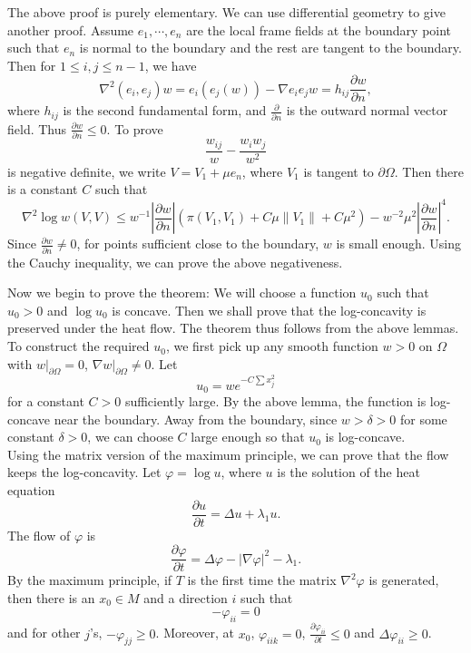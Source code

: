 \begin{remark}
The above proof is purely elementary. We can use differential geometry to give
another proof. Assume $e_1, \cdots, e_n$ are the local frame fields at the
boundary point such that $e_n$ is normal to the boundary and the rest are
tangent to the boundary. Then for $1\leqslant i, j \leqslant n-1$, we have
\[
\nabla^2 (e_i,e_j) w = e_i(e_j(w)) - \nabla e_i e_j w = h_{ij} 
\frac{\partial w}{\partial n},
\]
where $h_{ij}$ is the second fundamental form, and $\frac{\partial}{\partial n}$
is the outward normal vector field. Thus 
$\frac{\partial w}{\partial n} \leqslant 0$. To prove
\[
\frac{w_{ij}}{w} - \frac{w_i w_j}{w^2}
\]
is negative definite, we write $V=V_1 + \mu e_n$, where $V_1$ is tangent to
$\partial\Omega$. Then there is a constant $C$ such that
\[
\nabla^2 \log w(V,V) \leqslant w^{-1}\left|\frac{\partial w}{\partial n}\right|
(\pi(V_1, V_1) + C \mu \|V_1\| +C \mu^2) - 
w^{-2} \mu^2 \left|\frac{\partial w}{\partial n}\right|^4.
\]
Since $\frac{\partial w}{\partial n} \neq 0$, for points sufficient close to the
boundary, $w$ is small enough. Using the Cauchy inequality, we can prove the
above negativeness.
\end{remark}

Now we begin to prove the theorem: We will choose a function $u_0$ such that
$u_0 > 0$ and $\log u_0$ is concave. Then we shall prove that the log-concavity
is preserved under the heat flow. The theorem thus follows from the above
lemmas.
\\

To construct the required $u_0$, we first pick up any smooth function $w>0$ on
$\Omega$ with $w|_{\partial\Omega} = 0$, $\nabla w|_{\partial \Omega} \neq 0$.
Let
\[
u_0 = w e^{-C\sum x_j^2}
\]
for a constant $C > 0$ sufficiently large. By the above lemma, the function is 
log-concave near the boundary. Away from the boundary, since $w > \delta > 0$
for some constant $\delta > 0$, we can choose $C$ large enough so that $u_0$ is
log-concave.
\\

Using the matrix version of the maximum principle, we can prove that the flow
keeps the log-concavity. Let $\varphi = \log u$, where $u$ is the solution of
the heat equation
\[
\frac{\partial u}{\partial t} = \Delta u + \lambda_1 u.
\]
The flow of $\varphi$ is
\begin{equation}\label{2-1}
\frac{\partial\varphi}{\partial t} = \Delta\varphi - |\nabla\varphi|^2 - 
\lambda_1.
\end{equation}
By the maximum principle, if $T$ is the first time the matrix $\nabla^2\varphi$
is generated, then there is an $x_0\in M$ and a direction $i$ such that
\[
-\varphi_{ii} = 0
\]
and for other $j$'s, $-\varphi_{jj} \geqslant 0$. Moreover, at $x_0$,
$\varphi_{iik} = 0$, $\frac{\partial\varphi_{ii}}{\partial t} \leqslant 0$ and
$\Delta\varphi_{ii} \geqslant 0$.
\\

